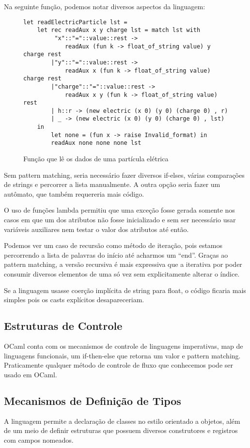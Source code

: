\documentclass[a4paper,10pt]{article}
\begin{document}
		Na seguinte função, podemos notar diversos aspectos da linguagem:
		\begin{figure}[H]
\begin{lstlisting}
let readElectricParticle lst =
	let rec readAux x y charge lst = match lst with
		 "x"::"="::value::rest -> 
			readAux (fun k -> float_of_string value) y charge rest
		|"y"::"="::value::rest -> 
			readAux x (fun k -> float_of_string value) charge rest
		|"charge"::"="::value::rest ->
			readAux x y (fun k -> float_of_string value) rest
		| h::r -> (new electric (x 0) (y 0) (charge 0) , r)
		| _ -> (new electric (x 0) (y 0) (charge 0) , lst)
	in
		let none = (fun x -> raise Invalid_format) in
		readAux none none none lst
	\end{lstlisting}
		\caption{Função que lê os dados de uma partícula elétrica}
		\label{readElectricParticle}
		\end{figure}
		
		Sem pattern matching, seria necessário fazer diversos if-elses, várias comparações de strings e percorrer a lista manualmente. A outra opção seria fazer um autômato, que também requereria mais código.
		
		O uso de funções lambda permitiu que uma exceção fosse gerada somente nos casos em que um dos atributos não fosse inicializado e sem ser necessário usar variáveis auxiliares nem testar o valor dos atributos até então.
		
		Podemos ver um caso de recursão como método de iteração, pois estamos percorrendo a lista de palavras do início até acharmos um ``end''. Graças ao pattern matching, a versão recursiva é mais expressiva que a iterativa por poder consumir diversos elementos de uma só vez sem explicitamente alterar o índice.
		
		Se a linguagem usasse coerção implícita de string para float, o código ficaria mais simples pois os casts explícitos desapareceriam.
		
	\subsection{Estruturas de Controle}
		OCaml conta com os mecanismos de controle de linguagens imperativas, map de linguagens funcionais, um if-then-else que retorna um valor e pattern matching. Praticamente qualquer método de controle de fluxo que conhecemos pode ser usado em OCaml.
		
	\subsection{Mecanismos de Definição de Tipos}
		A linguagem permite a declaração de classes no estilo orientado a objetos, além de um meio de definir estruturas que possuem diversos construtores e registros com campos nomeados. 
		
\end{document}
